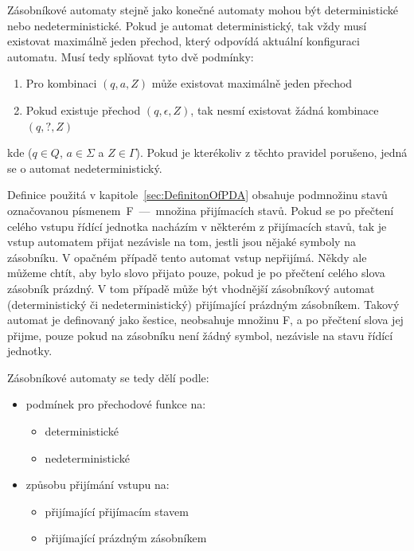 Zásobníkové automaty stejně jako konečné automaty mohou být deterministické nebo nedeterministické. Pokud je automat deterministický, tak vždy musí existovat maximálně jeden přechod, který odpovídá aktuální konfiguraci automatu. Musí tedy splňovat tyto dvě podmínky:
\begin{enumerate}
    \item Pro kombinaci $(q,a,Z)$ může existovat maximálně jeden přechod
    \item Pokud existuje přechod $(q,\epsilon,Z)$, tak nesmí existovat žádná kombinace $(q,?,Z)$
\end{enumerate}
kde ($q \in Q$, $a \in \Sigma$ a $Z \in \Gamma$). Pokud je kterékoliv z těchto pravidel porušeno, jedná se o automat nedeterministický.

Definice použitá v kapitole~\ref{sec:DefinitonOfPDA} obsahuje podmnožinu stavů označovanou písmenem~F~---~množina přijímacích stavů. Pokud se po přečtení celého vstupu řídící jednotka nacházím v některém z přijímacích stavů, tak je vstup automatem přijat nezávisle na tom, jestli jsou nějaké symboly na zásobníku. V opačném případě tento automat vstup nepřijímá. Někdy ale můžeme chtít, aby bylo slovo přijato pouze, pokud je po přečtení celého slova zásobník prázdný. V tom případě může být vhodnější zásobníkový automat (deterministický či nedeterministický) přijímající prázdným zásobníkem. Takový automat je definovaný jako šestice, neobsahuje množinu F, a po přečtení slova jej přijme, pouze pokud na zásobníku není žádný symbol, nezávisle na stavu řídící jednotky.

Zásobníkové automaty se tedy dělí podle:
\begin{itemize}
    \item podmínek pro přechodové funkce na:
        \begin{itemize}
            \item deterministické
            \item nedeterministické
        \end{itemize}
    \item způsobu přijímání vstupu na:
        \begin{itemize}
            \item přijímající přijímacím stavem
            \item přijímající prázdným zásobníkem
        \end{itemize}
\end{itemize}

